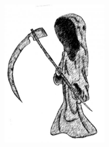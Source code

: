 \documentclass[a6paper,10pt]{article}
\begin{document}
\begin{figure}[!h]
\hfill
\includegraphics[width=0.4\textwidth]{liemannen.jpg}
\end{figure}
\end{document}
